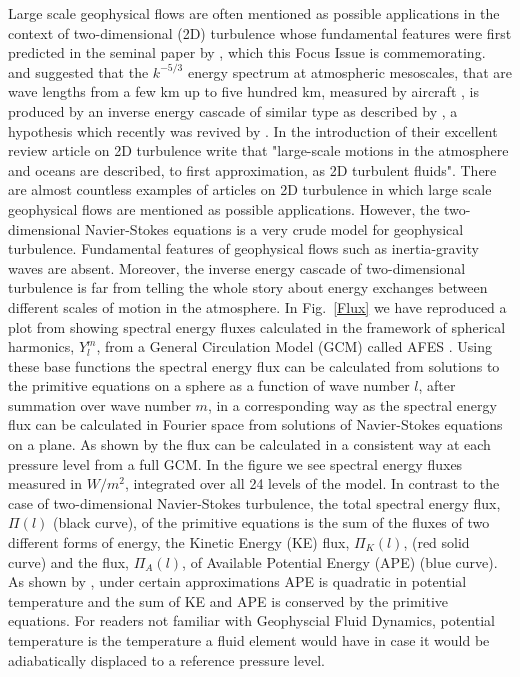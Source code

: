 Large scale geophysical flows are often mentioned as possible applications in the context of two-dimensional (2D) turbulence whose fundamental features were first predicted in the seminal paper  by \citet{Kraichnan1967}, which this Focus Issue is commemorating.
\citet{Gage:1979} and \citet{Lilly:1983} suggested that the $ k^{-5/3} $ energy spectrum at atmospheric mesoscales, that are wave lengths from a few km up to five hundred km, measured by aircraft \citep{Nastrom-Gage:1985, Lindborg:1999}, is produced by an inverse energy cascade of similar type as described by \citet{Kraichnan1967}, a  hypothesis which recently was revived by \citet{Xia2011}. 
In the introduction of their excellent review article on 2D turbulence \citet{Boffetta2012} write that "large-scale motions in the atmosphere and oceans are described, to first approximation, as 2D turbulent fluids". There are almost countless examples of articles on 2D turbulence in which large scale geophysical flows are mentioned as possible applications. 
However, the two-dimensional Navier-Stokes equations is  a very crude model for geophysical turbulence. Fundamental features of geophysical flows such as inertia-gravity waves are absent. Moreover, the inverse energy cascade of two-dimensional turbulence is far from telling the whole story  about energy exchanges between different scales of motion in the atmosphere. In Fig.~\ref{Flux} we have reproduced  a plot from \citet{Augier-Lindborg:2013} showing spectral energy fluxes calculated in the framework of spherical harmonics, $ Y_l^m $, from a General Circulation Model (GCM) called AFES \citep{Hamilton-Takahashi-Ohfuchi:2008}.
Using these base functions the spectral energy flux can be calculated from solutions to the primitive equations \citep{Vallis:book} on a sphere as a function of wave number $ l $, after summation over wave number $ m $, in a corresponding way as the spectral energy flux can be calculated in Fourier space from solutions of Navier-Stokes equations on a plane. 
As shown by  \citet{Augier-Lindborg:2013} the flux can be calculated in a consistent way at each pressure level from a full  GCM. In the figure  we see spectral energy fluxes measured in $ W/m^2 $, integrated over all 24 levels of the model. In contrast to the case of  two-dimensional Navier-Stokes turbulence, the total spectral energy flux, $ \Pi (l) $  (black curve), of the primitive equations is the sum of the fluxes of two different forms of energy, the Kinetic Energy (KE) flux, $ \Pi_K(l) $, (red solid curve) and the flux, $ \Pi_A(l) $, of Available Potential Energy (APE) (blue curve). As shown by \citet{Lorenz:1955}, under certain approximations APE is quadratic in potential temperature and the sum of KE and APE is conserved by the primitive equations. For readers not familiar with Geophyscial Fluid Dynamics, potential temperature is the temperature a fluid element would have in case it would be adiabatically displaced to a reference pressure level. 
